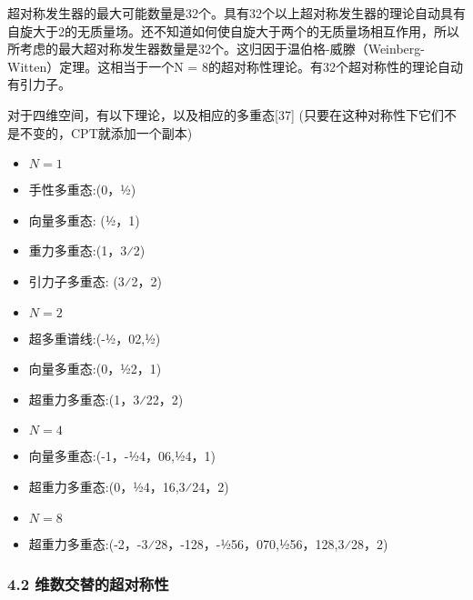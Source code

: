 超对称发生器的最大可能数量是32个。具有32个以上超对称发生器的理论自动具有自旋大于2的无质量场。还不知道如何使自旋大于两个的无质量场相互作用，所以所考虑的最大超对称发生器数量是32个。这归因于温伯格-威滕（Weinberg-Witten）定理。这相当于一个N = 8的超对称性理论。有32个超对称性的理论自动有引力子。

对于四维空间，有以下理论，以及相应的多重态[37] (只要在这种对称性下它们不是不变的，CPT就添加一个副本)
\begin{itemize}
\item $N = 1$
\item 手性多重态:(0，1⁄2)
\item 向量多重态: (1⁄2，1)
\item 重力多重态:(1，3⁄2)
\item 引力子多重态: (3⁄2，2)
\end{itemize}
\begin{itemize}
\item $N = 2$
\item 超多重谱线:(-1⁄2，02,1⁄2)
\item 向量多重态:(0，1⁄22，1)
\item 超重力多重态:(1，3⁄22，2)
\end{itemize}
\begin{itemize}
\item $N = 4$
\item 向量多重态:(-1，-1⁄24，06,1⁄24，1)
\item 超重力多重态:(0，1⁄24，16,3⁄24，2)
\end{itemize}
\begin{itemize}
\item $N = 8$
\item 超重力多重态:(-2，-3⁄28，-128，-1⁄256，070,1⁄256，128,3⁄28，2)
\end{itemize}
\subsubsection{4.2 维数交替的超对称性}
